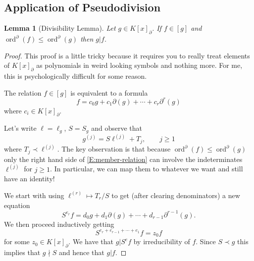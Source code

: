 \documentclass[12pt]{book}
\numberwithin{equation}{section}
\newtheorem{lemma}[theorem]{Lemma}
\theoremstyle{definition}
\theoremstyle{remark}
\newcommand{\ord}{\operatorname{ord}}
\begin{document}
\subsection{Application of Pseudodivision}\label{S:application-of-division}


\begin{lemma}[Divisibility Lemma]
	Let $g \in K [x]_{\partial}$.
	If $f \in [g]$ and $\ord^{\partial}(f) \leq \ord^{\partial}(g)$ then $g \vert f$. 
\end{lemma}
\begin{proof}
	This proof is a little tricky because it requires you to really treat elements of $K[x]_{\partial}$ as polynomials in weird looking symbols and nothing more. 
	For me, this is psychologically difficult for some reason.
	
	The relation $f \in [g]$ is equivalent to a formula 
	\begin{equation}\label{E:member-relation}
	 f = c_0 g + c_1 \partial(g) + \cdots + c_r \partial^r(g)
	\end{equation}
	where $c_i \in K[x]_{\partial}$.
	
	Let's write $\ell = \ell_g$, $S=S_g$ and observe that 
	 $$ g^{(j)} = S\ell^{(j)} + T_j, \qquad j\geq 1 $$
	where $T_j\prec \ell^{(j)}$.
	The key observation is that because $\ord^{\partial}(f)\leq \ord^{\partial}(g)$ only the right hand side of \eqref{E:member-relation} can involve the indeterminates $\ell^{(j)}$ for $j\geq 1$.
	In particular, we can map them to whatever we want and still have an identity!
	
	We start with using $\ell^{(r)} \mapsto T_r/S$ to get (after clearing denominators) a new equation
	 $$ S^{e_r} f = d_0 g+ d_1 \partial(g) + \cdots + d_{r-1} \partial^{r-1}(g).$$
	We then proceed inductively getting 
	 $$ S^{e_r+e_{r-1}+\cdots + e_1} f = z_0 f $$
	for some $z_0 \in K[x]_{\partial}$.
	We have that $g \vert S^e f$ by irreducibility of $f$. 
	Since $S\prec g$ this implies that $g\nmid S$ and hence that $g \vert f$. 
\end{proof}
\end{document}
